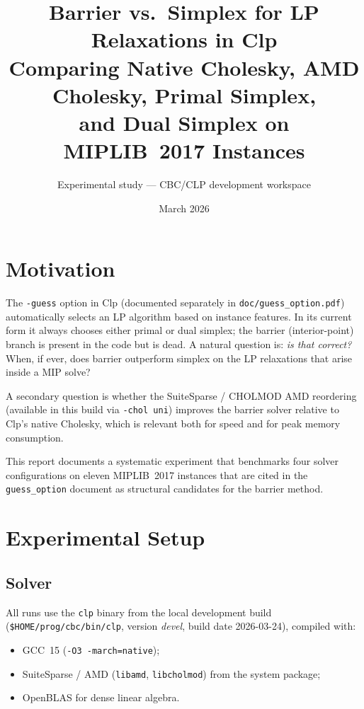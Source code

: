 \documentclass[11pt,a4paper]{article}
\title{\textbf{Barrier vs.\ Simplex for LP Relaxations in Clp}\\[0.4em]
       \large Comparing Native Cholesky, AMD Cholesky, Primal Simplex,\\
              and Dual Simplex on MIPLIB~2017 Instances}
\author{Experimental study --- CBC/CLP development workspace}
\date{March 2026}
\begin{document}
\maketitle
\tableofcontents
\bigskip

\section{Motivation}

The \texttt{-guess} option in Clp (documented separately in
\texttt{doc/guess\_option.pdf}) automatically selects an LP algorithm based on
instance features.  In its current form it always chooses either primal or dual
simplex; the barrier (interior-point) branch is present in the code but is dead.
A natural question is: \emph{is that correct?}  When, if ever, does barrier
outperform simplex on the LP relaxations that arise inside a MIP solve?

A secondary question is whether the SuiteSparse / CHOLMOD AMD reordering
(available in this build via \texttt{-chol~uni}) improves the barrier solver
relative to Clp's native Cholesky, which is relevant both for speed and for
peak memory consumption.

This report documents a systematic experiment that benchmarks four solver
configurations on eleven MIPLIB~2017 instances that are cited in the
\texttt{guess\_option} document as structural candidates for the barrier
method.

\section{Experimental Setup}

\subsection{Solver}

All runs use the \texttt{clp} binary from the local development build
(\texttt{\$HOME/prog/cbc/bin/clp}, version \emph{devel}, build date
2026-03-24), compiled with:
\begin{itemize}
  \item GCC~15 (\texttt{-O3 -march=native});
  \item SuiteSparse / AMD (\texttt{libamd}, \texttt{libcholmod}) from the
        system package;
  \item OpenBLAS for dense linear algebra.
\end{itemize}
\end{document}
